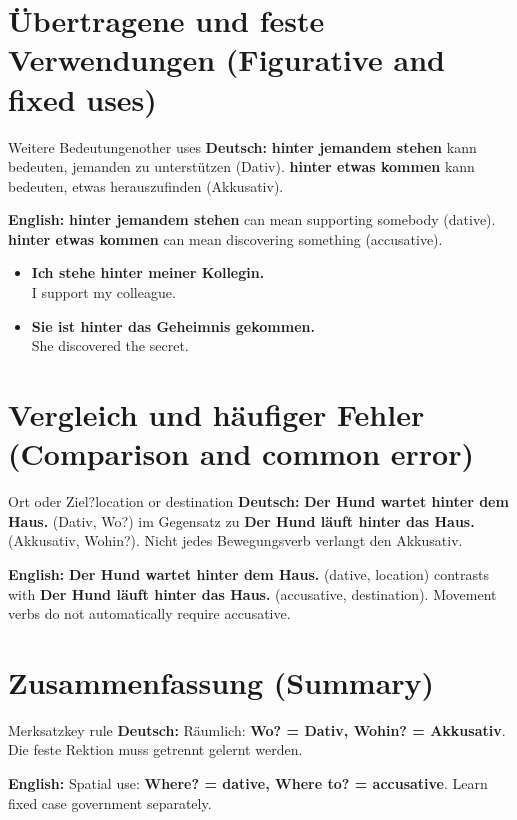 \documentclass[a4paper,11pt]{article}
\newcommand{\GermanText}[1]{\textbf{Deutsch: }#1\par}
\newcommand{\EnglishText}[1]{{\small\color{SoftGray}\textbf{English: }#1\par}}
\newcommand{\ExampleItem}[2]{\item \textbf{#1}\\{\small\color{SoftGray}#2}}
\begin{document}
\section{Übertragene und feste Verwendungen (Figurative and fixed uses)}
\begin{grammarentry}{Weitere Bedeutungen}{other uses}
\GermanText{\textbf{hinter jemandem stehen} kann bedeuten, jemanden zu unterstützen (Dativ). \textbf{hinter etwas kommen} kann bedeuten, etwas herauszufinden (Akkusativ).}
\EnglishText{\textbf{hinter jemandem stehen} can mean supporting somebody (dative). \textbf{hinter etwas kommen} can mean discovering something (accusative).}
\end{grammarentry}
\begin{exbox}
\begin{itemize}
\ExampleItem{Ich stehe hinter meiner Kollegin.}{I support my colleague.}
\ExampleItem{Sie ist hinter das Geheimnis gekommen.}{She discovered the secret.}
\end{itemize}
\end{exbox}
\section{Vergleich und häufiger Fehler (Comparison and common error)}
\begin{grammarentry}{Ort oder Ziel?}{location or destination}
\GermanText{\textbf{Der Hund wartet hinter dem Haus.} (Dativ, Wo?) im Gegensatz zu \textbf{Der Hund läuft hinter das Haus.} (Akkusativ, Wohin?). Nicht jedes Bewegungsverb verlangt den Akkusativ.}
\EnglishText{\textbf{Der Hund wartet hinter dem Haus.} (dative, location) contrasts with \textbf{Der Hund läuft hinter das Haus.} (accusative, destination). Movement verbs do not automatically require accusative.}
\end{grammarentry}
\section{Zusammenfassung (Summary)}
\begin{grammarentry}{Merksatz}{key rule}
\GermanText{Räumlich: \textbf{Wo? = Dativ, Wohin? = Akkusativ}. Die feste Rektion muss getrennt gelernt werden.}
\EnglishText{Spatial use: \textbf{Where? = dative, Where to? = accusative}. Learn fixed case government separately.}
\end{grammarentry}
\end{document}
